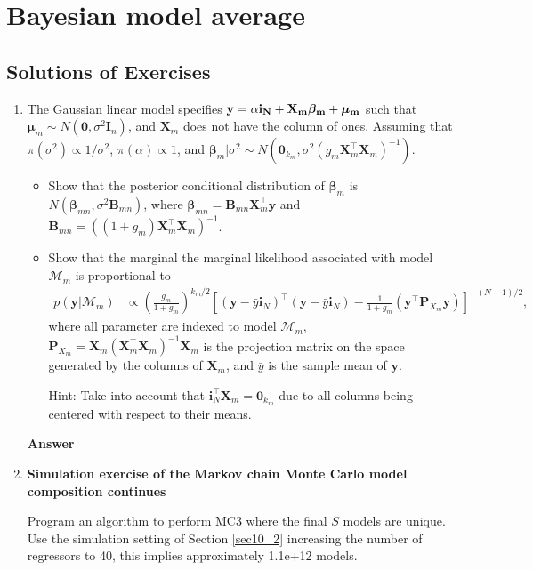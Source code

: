 \chapter{Bayesian model average}\label{chap10}

\section{Solutions of Exercises}\label{sec101}
\begin{enumerate}[leftmargin=*]

	\item The Gaussian linear model specifies $\bf{y}=\alpha\bm{i}_N+\bm{X}_m\bm{\beta}_m+\bm{\mu}_m$ such that $\bm{\mu}_m\sim{N}(\bm{0},\sigma^2\bm{I}_n)$, and $\bm{X}_m$ does not have the column of ones. Assuming that $\pi(\sigma^2)\propto 1/{\sigma^2}$, $\pi(\alpha)\propto 1$, and $\bm{\beta}_m|\sigma^2 \sim {N}(\bm{0}_{k_m}, \sigma^2 (g_m\bm{X}_m^{\top}\bm{X}_m)^{-1})$.
\begin{itemize}
	\item Show that the posterior conditional distribution of $\bm{\beta}_m$ is $N(\bm{\beta}_{mn},\sigma^2\bm{B}_{mn})$, where $\bm{\beta}_{mn}=\bm{B}_{mn}\bm{X}_m^{\top}\bm{y}$ and $\bm{B}_{mn}=((1+g_m)\bm{X}_m^{\top}\bm{X}_m)^{-1}$.
	\item Show that the marginal the marginal likelihood associated with model $\mathcal{M}_m$ is proportional to
	\begin{align*}
		p(\bm{y}|\mathcal{M}_m)&\propto \left(\frac{g_m}{1+g_m}\right)^{k_m/2} \left[(\bm{y}-\bar{y}\bm{i}_N)^{\top}(\bm{y}-\bar{y}\bm{i}_N)-\frac{1}{1+g_m}(\bm{y}^{\top}\bm{P}_{X_m}\bm{y})\right]^{-(N-1)/2},
	\end{align*}
	where all parameter are indexed to model $\mathcal{M}_m$, $\bm{P}_{X_m}=\bm{X}_m(\bm{X}_m^{\top}\bm{X}_m)^{-1}\bm{X}_m$ is the projection matrix on the space generated by the columns of $\bm{X}_m$, and $\bar{y}$ is the sample mean of $\bm{y}$.
	
	Hint: Take into account that $\bm{i}_N^{\top}\bm{X}_m=\bm{0}_{k_m}$ due to all columns being centered with respect to their means.
\end{itemize}
\textbf{Answer}

\item \textbf{Simulation exercise of the Markov chain Monte Carlo model composition continues}

Program an algorithm to perform MC3 where the final $S$ models are unique. Use the simulation setting of Section \ref{sec10_2} increasing the number of regressors to 40, this implies approximately 1.1e+12 models. 	
	

\end{enumerate}
